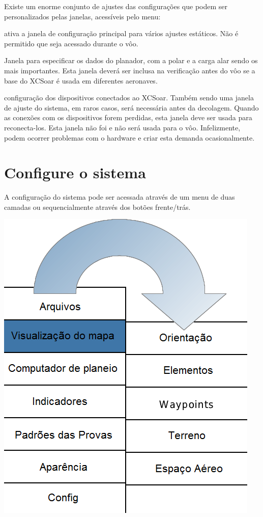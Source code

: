Existe um enorme conjunto de ajustes das configurações que podem ser personalizados pelas janelas, acessíveis pelo menu:
\begin{jspecs}
\item[\bmenug{Config 2/3}\blink\bmenug{Sistema}] ativa a janela de configuração principal para vários ajustes estáticos.  Não é permitido que seja acessado durante o vôo.
\item[\bmenug{Config 2/3}\blink\bmenug{Planador}] Janela para especificar os dados do planador, com a polar e a carga alar sendo os mais importantes.  Esta janela deverá ser inclusa na verificação antes do vôo se a base do XCSoar é usada em diferentes aeronaves.
\item[\bmenug{Config 2/3}\blink\bmenug{Dispositivos}] configuração dos dispositivos conectados ao XCSoar.  Também sendo uma janela de ajuste do sistema, em raros casos, será necessária antes da decolagem.  Quando as conexões com os dispositivos forem perdidas, esta janela deve ser usada para reconecta-los.  Esta janela não foi e não será usada para o vôo.  Infelizmente, podem ocorrer problemas com o hardware e criar esta demanda ocasionalmente.  
\end{jspecs}

\section{Configure o sistema}
A configuração do sistema pode ser acessada através de um menu de duas camadas 
ou sequencialmente através dos botões frente/trás.

\begin{center}
\includegraphics[angle=0,width=0.5\linewidth,keepaspectratio='true']{figures/config-menu.png}
\end{center}

